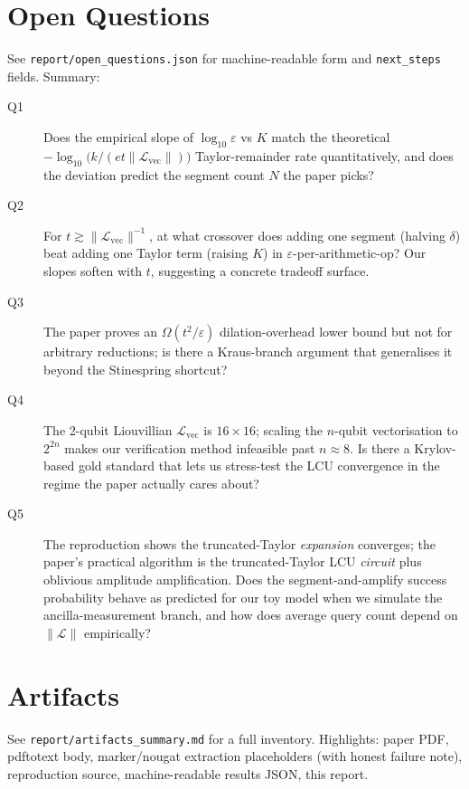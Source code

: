 \documentclass[11pt]{article}
\begin{document}
\section{Open Questions}
See \texttt{report/open\_questions.json} for machine-readable form and
\texttt{next\_steps} fields. Summary:

\begin{description}
    \item[Q1] Does the empirical slope of $\log_{10}\varepsilon$ vs $K$ match
        the theoretical $-\log_{10}\!\bigl(k/(et\lVert\mathcal L_{\mathrm{vec}}\rVert)\bigr)$
        Taylor-remainder rate quantitatively, and does the deviation predict
        the segment count $N$ the paper picks?
    \item[Q2] For $t \gtrsim \lVert\mathcal L_{\mathrm{vec}}\rVert^{-1}$, at what
        crossover does adding one segment (halving $\delta$) beat adding one
        Taylor term (raising $K$) in $\varepsilon$-per-arithmetic-op?
        Our slopes soften with $t$, suggesting a concrete tradeoff surface.
    \item[Q3] The paper proves an $\Omega(t^2/\varepsilon)$ dilation-overhead
        lower bound but not for arbitrary reductions; is there a Kraus-branch
        argument that generalises it beyond the Stinespring shortcut?
    \item[Q4] The 2-qubit Liouvillian $\mathcal L_{\mathrm{vec}}$ is
        $16\times16$; scaling the $n$-qubit vectorisation to $2^{2n}$ makes
        our verification method infeasible past $n\!\approx\!8$. Is there a
        Krylov-based gold standard that lets us stress-test the LCU
        convergence in the regime the paper actually cares about?
    \item[Q5] The reproduction shows the truncated-Taylor \emph{expansion}
        converges; the paper's practical algorithm is the truncated-Taylor
        LCU \emph{circuit} plus oblivious amplitude amplification. Does the
        segment-and-amplify success probability behave as predicted for our
        toy model when we simulate the ancilla-measurement branch, and how
        does average query count depend on $\lVert\mathcal L\rVert$ empirically?
\end{description}

\section{Artifacts}
See \texttt{report/artifacts\_summary.md} for a full inventory. Highlights:
paper PDF, pdftotext body, marker/nougat extraction placeholders (with
honest failure note), reproduction source, machine-readable results JSON,
this report.
\end{document}
